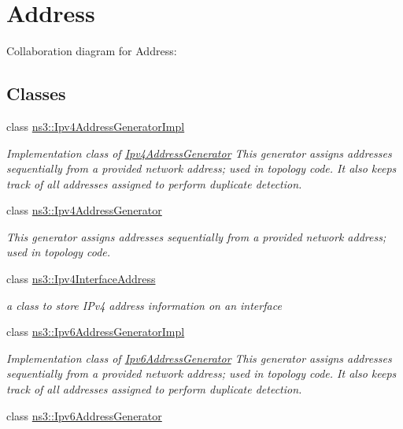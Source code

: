 \hypertarget{group__address}{}\section{Address}
\label{group__address}
Collaboration diagram for Address\+:
\subsection*{Classes}
\begin{DoxyCompactItemize}
\item 
class \hyperlink{classns3_1_1Ipv4AddressGeneratorImpl}{ns3\+::\+Ipv4\+Address\+Generator\+Impl}
\begin{DoxyCompactList}\small\item\em Implementation class of \hyperlink{classns3_1_1Ipv4AddressGenerator}{Ipv4\+Address\+Generator} This generator assigns addresses sequentially from a provided network address; used in topology code. It also keeps track of all addresses assigned to perform duplicate detection. \end{DoxyCompactList}\item 
class \hyperlink{classns3_1_1Ipv4AddressGenerator}{ns3\+::\+Ipv4\+Address\+Generator}
\begin{DoxyCompactList}\small\item\em This generator assigns addresses sequentially from a provided network address; used in topology code. \end{DoxyCompactList}\item 
class \hyperlink{classns3_1_1Ipv4InterfaceAddress}{ns3\+::\+Ipv4\+Interface\+Address}
\begin{DoxyCompactList}\small\item\em a class to store I\+Pv4 address information on an interface \end{DoxyCompactList}\item 
class \hyperlink{classns3_1_1Ipv6AddressGeneratorImpl}{ns3\+::\+Ipv6\+Address\+Generator\+Impl}
\begin{DoxyCompactList}\small\item\em Implementation class of \hyperlink{classns3_1_1Ipv6AddressGenerator}{Ipv6\+Address\+Generator} This generator assigns addresses sequentially from a provided network address; used in topology code. It also keeps track of all addresses assigned to perform duplicate detection. \end{DoxyCompactList}\item 
class \hyperlink{classns3_1_1Ipv6AddressGenerator}{ns3\+::\+Ipv6\+Address\+Generator}

\end{DoxyCompactItemize}
